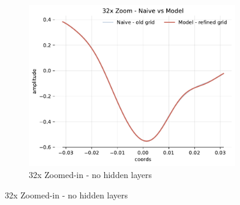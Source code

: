 \begin{figure}[!h]
    \begin{subfigure}[b]{0.32\textwidth}
        \centering
        \includegraphics[width=\textwidth]{img/ch3/32x-2048hf-0hl-64w-sub3.pdf}
        \caption{32x Zoomed-in - no hidden layers}
    \end{subfigure}


\end{figure}
